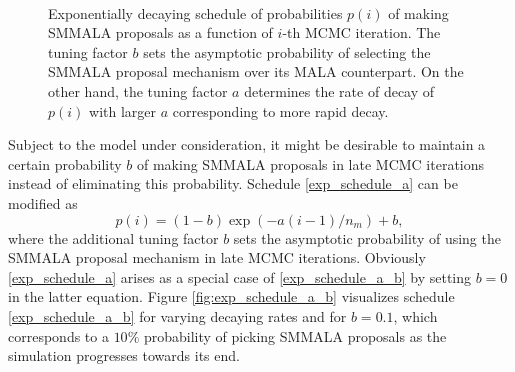 \documentclass[twoside,11pt]{article}
\begin{document}
\begin{figure}[t]
	\centering
	 \\
	\caption{Exponentially decaying schedule of probabilities $p(i)$ of making SMMALA proposals as a function of
	$i$-th MCMC iteration. The tuning factor $b$ sets the asymptotic probability of selecting the SMMALA proposal mechanism
	over its MALA counterpart. On the other hand, the tuning factor $a$ determines the rate of decay of $p(i)$ with larger 
	$a$ corresponding to more rapid decay.}
	\label{fig:exp_schedule}
\end{figure}

Subject to the model under consideration, it might be desirable to maintain a certain probability $b$ of making SMMALA 
proposals in late MCMC iterations instead of eliminating this probability. Schedule \eqref{exp_schedule_a} can be modified as
\begin{equation}
\label{exp_schedule_a_b}
p(i)=(1-b)\exp{(-a(i-1)/n_m)}+b,
\end{equation}
where the additional tuning factor $b$ sets the asymptotic probability of using the SMMALA proposal mechanism in late MCMC
iterations. Obviously \eqref{exp_schedule_a} arises as a special case of \eqref{exp_schedule_a_b} by setting $b=0$ in the 
latter equation. Figure \ref{fig:exp_schedule_a_b} visualizes schedule \eqref{exp_schedule_a_b} for varying decaying rates 
and for $b=0.1$, which corresponds to a $10\%$ probability of picking SMMALA proposals as the simulation progresses towards 
its end.
\end{document}
